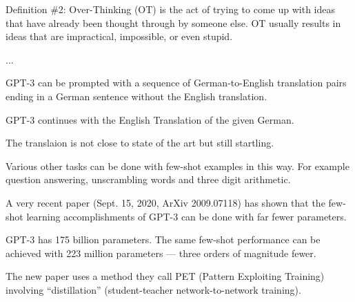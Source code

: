 {\vfill
Definition \#2: Over-Thinking (OT) is the act of trying to come up with ideas that have already been thought through by someone else. OT usually results in ideas that are impractical, impossible, or even stupid.

\vfill
...


GPT-3 can be prompted with a sequence of German-to-English translation pairs ending in a German sentence without the English translation.

\vfill
GPT-3 continues with the English Translation of the given German.

\vfill
The translaion is not close to state of the art but still startling.

\vfill
Various other tasks can be done with few-shot examples in this way.  For example question answering, unscrambling words and three digit arithmetic.


A very recent paper (Sept. 15, 2020, ArXiv 2009.07118) has shown that the few-shot learning accomplishments of GPT-3 can be done with far fewer parameters.

\vfill
GPT-3 has 175 billion parameters.  The same few-shot performance can be achieved with 223 million parameters --- three orders of magnitude fewer.

\vfill
The new paper uses a method they call PET (Pattern Exploiting Training) involving ``distillation'' (student-teacher network-to-network training).


}

